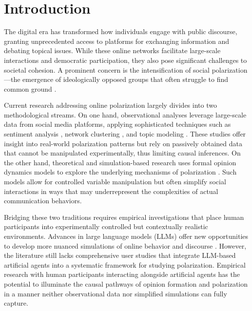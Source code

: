 \section{Introduction}
\label{sec:intro}

The digital era has transformed how individuals engage with public discourse, granting unprecedented access to platforms for exchanging information and debating topical issues. While these online networks facilitate large-scale interactions and democratic participation, they also pose significant challenges to societal cohesion. A prominent concern is the intensification of social polarization---the emergence of ideologically opposed groups that often struggle to find common ground \cite{grover_dilemma_2022, kubin_role_2021, bail_exposure_2018}.

Current research addressing online polarization largely divides into two methodological streams. On one hand, observational analyses leverage large-scale data from social media platforms, applying sophisticated techniques such as sentiment analysis \cite{karjus_evolving_2024, alsinet_measuring_2021, buder_does_2021}, network clustering \cite{treuillier_gaining_2024, bond_political_2022, al_amin_unveiling_2017}, and topic modeling \cite{kim_polarized_2019, chen_modeling_2021}. These studies offer insight into real-world polarization patterns but rely on passively obtained data that cannot be manipulated experimentally, thus limiting causal inferences. On the other hand, theoretical and simulation-based research uses formal opinion dynamics models to explore the underlying mechanisms of polarization \cite{hegselmann_opinion_2002,degroot_reaching_1974,sasahara_social_2021,del_vicario_modeling_2017}. Such models allow for controlled variable manipulation but often simplify social interactions in ways that may underrepresent the complexities of actual communication behaviors.

Bridging these two traditions requires empirical investigations that place human participants into experimentally controlled but contextually realistic environments. Advances in large language models (LLMs) offer new opportunities to develop more nuanced simulations of online behavior and discourse \cite{chuang_simulating_2024,breum_persuasive_2024,ohagi_polarization_2024}. However, the literature still lacks comprehensive user studies that integrate LLM-based artificial agents into a systematic framework for studying polarization. Empirical research with human participants interacting alongside artificial agents has the potential to illuminate the causal pathways of opinion formation and polarization in a manner neither observational data nor simplified simulations can fully capture.

